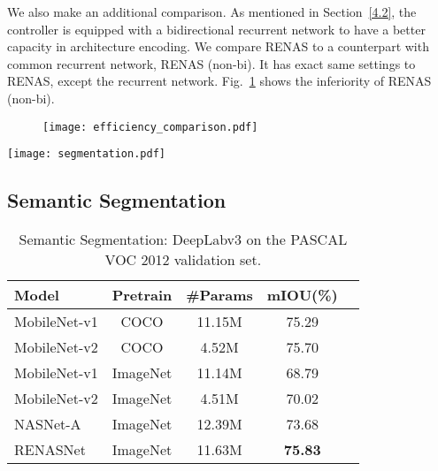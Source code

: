 \documentclass[10pt,twocolumn,letterpaper]{article}
\begin{document}
We also make an additional comparison. As mentioned in Section~\ref{4.2}, the controller is equipped with a bidirectional recurrent network to have a better capacity in architecture encoding. We compare RENAS to a counterpart with common recurrent network, RENAS (non-bi). It has exact same settings to RENAS, except the recurrent network. Fig.~\ref{fig:4} shows the inferiority of RENAS (non-bi).

	\begin{figure}[t]
		\centering
		\texttt{[image: efficiency\_comparison.pdf]}%
		\label{fig:4}
	\end{figure}		
	
	
		\begin{figure*}[ht]%
		\centering
		\texttt{[image: segmentation.pdf]}%
		\label{fig:5}
	\end{figure*}

\subsection{Semantic Segmentation}

  \begin{table}[!hbt]
  \centering
  \caption{Semantic Segmentation: DeepLabv3 on the PASCAL VOC 2012 validation set.} \label{tab:4}
      \begin{threeparttable}
  \begin{tabular}{ l  c | c  c  c }
  \hline
      Model 					& Pretrain & \#Params  &  mIOU(\%) \\ %
      \hline  
	MobileNet-v1 \cite{howard2017mobilenets}	 & COCO		 & 11.15M	  & 75.29  \\ %
	MobileNet-v2 \cite{sandler2018inverted}		 	 & COCO		 &  4.52M		   & 75.70	\\ %
      \hline
	MobileNet-v1 \cite{howard2017mobilenets}	 & ImageNet		 & 11.14M   & 68.79   \\ %
	MobileNet-v2 \cite{sandler2018inverted}		 	 & ImageNet		 & 4.51M	   & 70.02	\\  %
	NASNet-A \cite{zoph2017learning}		 			 & ImageNet		 &	 12.39M   & 73.68	\\ %
	RENASNet 					 										 & ImageNet		 &	 11.63M   & \textbf{75.83}	\\%
      \hline
  \end{tabular}
    \end{threeparttable}
  \end{table}
  
\end{document}
